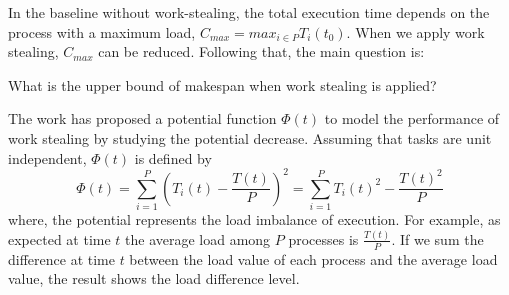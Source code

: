 In the baseline without work-stealing, the total execution time depends on the process with a maximum load, $C_{max} = max_{i \in P} T_i(t_0)$. When we apply work stealing, $C_{max}$ can be reduced. Following that, the main question is:
\begin{shaded}
	\noindent What is the upper bound of makespan when work stealing is applied?
\end{shaded}

The work \cite{tchiboukdjian2010tighter} has proposed a potential function $\Phi (t)$ to model the performance of work stealing by studying the potential decrease. Assuming that tasks are unit independent, $\Phi (t)$ is defined by
\begin{equation} \label{eq:phi_defi}
	\Phi(t) = \sum_{i=1}^{P} (T_{i}(t) - \frac{T(t)}{P})^{2} = \sum_{i=1}^{P} T_{i}(t)^{2} - \frac{T(t)^2}{P}
\end{equation}
where, the potential represents the load imbalance of execution. For example, as expected at time $t$ the average load among $P$ processes is $\frac{T(t)}{P}$. If we sum the difference at time $t$ between the load value of each process and the average load value, the result shows the load difference level. \\

